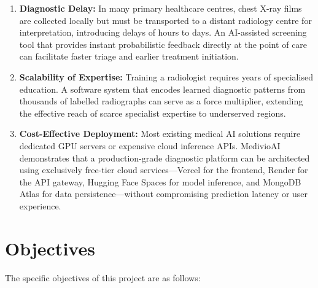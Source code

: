 \documentclass[12pt, a4paper, oneside]{report}
\begin{document}
\begin{enumerate}[label=\arabic*.]
    \item \textbf{Diagnostic Delay:} In many primary healthcare centres, chest X-ray films are collected locally but must be transported to a distant radiology centre for interpretation, introducing delays of hours to days. An AI-assisted screening tool that provides instant probabilistic feedback directly at the point of care can facilitate faster triage and earlier treatment initiation.

    \item \textbf{Scalability of Expertise:} Training a radiologist requires years of specialised education. A software system that encodes learned diagnostic patterns from thousands of labelled radiographs can serve as a force multiplier, extending the effective reach of scarce specialist expertise to underserved regions.

    \item \textbf{Cost-Effective Deployment:} Most existing medical AI solutions require dedicated GPU servers or expensive cloud inference APIs. MedivioAI demonstrates that a production-grade diagnostic platform can be architected using exclusively free-tier cloud services---Vercel for the frontend, Render for the API gateway, Hugging Face Spaces for model inference, and MongoDB Atlas for data persistence---without compromising prediction latency or user experience.
\end{enumerate}

\section{Objectives}
\label{sec:objectives}

The specific objectives of this project are as follows:
\end{document}
